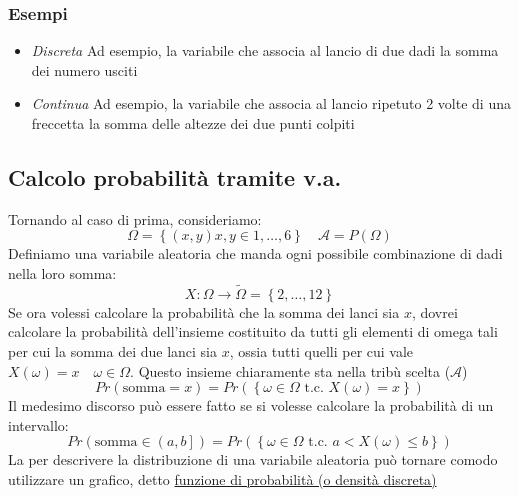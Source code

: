 \subsubsection*{Esempi}
\begin{itemize}
	\item \textit{Discreta} Ad esempio, la variabile che associa al lancio di due dadi la somma dei numero usciti
	\item \textit{Continua} Ad esempio, la variabile che associa al lancio ripetuto 2 volte di una freccetta la somma delle altezze dei due punti colpiti
\end{itemize}
\subsection{Calcolo probabilità tramite v.a.}
Tornando al caso di prima, consideriamo:
\[
	\Omega = \left\{\left(x, y\right) x,y \in 1,\ldots ,6\right\} \quad \mathcal{A} = P\left(\Omega\right)
\]
Definiamo una variabile aleatoria che manda ogni possibile combinazione di dadi nella loro somma:
\[
	X: \Omega \to  \tilde{\Omega } = \left\{2, \ldots ,12\right\}
\]
Se ora volessi calcolare la probabilità che la somma dei lanci sia $ x $, dovrei calcolare la probabilità dell'insieme costituito da tutti gli elementi di omega tali per cui la somma dei due lanci sia $ x $, ossia tutti quelli per cui vale $ X\left(\omega \right) = x \quad \omega  \in \Omega$. Questo insieme chiaramente sta nella tribù scelta ($ \mathcal{A} $)
\[
	Pr\left( \text{somma} = x\right) = Pr\left(\left\{\omega \in \Omega \text{ t.c. } X\left(\omega \right) = x\right\}\right)
\]
Il medesimo discorso può essere fatto se si volesse calcolare la probabilità di un intervallo:
\[
	Pr\left( \text{somma} \in \left(a,b\right] \right) = Pr\left(\left\{\omega \in \Omega \text{ t.c. } a < X\left(\omega \right) \le b \right\}\right)
\]
La per descrivere la distribuzione di una variabile aleatoria può tornare comodo utilizzare un grafico, detto \underline{funzione di probabilità (o densità discreta)}
